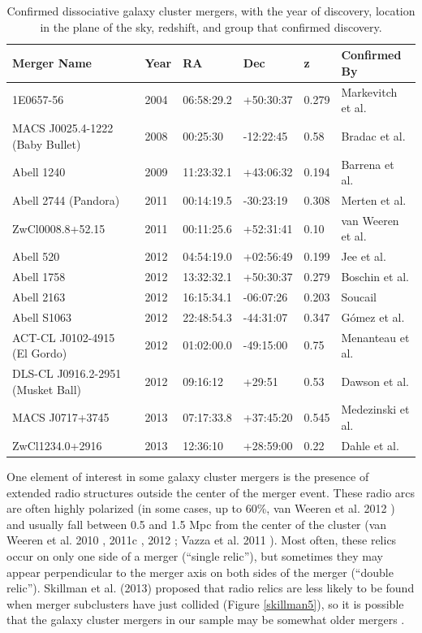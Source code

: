 \documentclass[12 pt]{article}
\renewcommand{\baselinestretch}{2}
\begin{document}
\renewcommand{\baselinestretch}{1}
\begin{table}
\begin{tabular}{|p{2in}|l|l|l|l|l|} \hline
\textbf{Merger Name} & \textbf{Year} & \textbf{RA} & \textbf{Dec} & \textbf{z} & \textbf{Confirmed By} \\ \hline
1E0657-56 & 2004 & 06:58:29.2 & +50:30:37 & 0.279 & Markevitch et al. \cite{Markevitch04} \\
MACS J0025.4-1222 (Baby Bullet) & 2008 & 00:25:30 & -12:22:45 & 0.58 & Bradac et al. \cite{Bradac08} \\
Abell 1240 & 2009 & 11:23:32.1 & +43:06:32 & 0.194 & Barrena et al. \cite{Barrena09} \\
Abell 2744 (Pandora) & 2011 & 00:14:19.5 & -30:23:19 & 0.308 & Merten et al. \cite{Merten11} \\
ZwCl0008.8+52.15 & 2011 & 00:11:25.6 & +52:31:41 & 0.10 & van Weeren et al. \cite{reinout11b} \\
Abell 520 & 2012 & 04:54:19.0 & +02:56:49 & 0.199 & Jee et al. \cite{Jee12} \\
Abell 1758 & 2012 & 13:32:32.1 & +50:30:37 & 0.279 & Boschin et al. \cite{Boschin12} \\
Abell 2163 & 2012 & 16:15:34.1 & -06:07:26 & 0.203 & Soucail  \cite{Soucail12} \\
Abell S1063 & 2012 & 22:48:54.3 & -44:31:07 & 0.347 & G{\'o}mez et al. \cite{Gomez12} \\
ACT-CL J0102-4915 (El Gordo) & 2012 & 01:02:00.0 & -49:15:00 & 0.75 & Menanteau et al. \cite{Menanteau12} \\
DLS-CL J0916.2-2951 (Musket Ball) & 2012 & 09:16:12 & +29:51 & 0.53 & Dawson et al. \cite{Dawson12} \\
MACS J0717+3745 & 2013 & 07:17:33.8 & +37:45:20 & 0.545 & Medezinski et al. \cite{Medezinski13} \\
ZwCl1234.0+2916 & 2013 & 12:36:10 & +28:59:00 & 0.22 & Dahle et al. \cite{Dahle13} \\
\hline
\end{tabular}
\caption{Confirmed dissociative galaxy cluster mergers, with the year of discovery, location in the plane of the sky, redshift, and group that confirmed discovery.}
\label{tab2}
\end{table}
\renewcommand{\baselinestretch}{1}

One element of interest in some galaxy cluster mergers is the presence of extended radio structures outside the center of the merger event. These radio arcs are often highly polarized (in some cases, up to 60\%, van Weeren et al. 2012 \cite{reinout12}) and usually fall between 0.5 and 1.5 Mpc from the center of the cluster (van Weeren et al. 2010 \cite{reinout10}, 2011c \cite{reinout11c}, 2012 \cite{reinout12}; Vazza et al. 2011 \cite{Vazza11}). Most often, these relics occur on only one side of a merger (“single relic”), but sometimes they may appear perpendicular to the merger axis on both sides of the merger (“double relic”). Skillman et al. (2013) proposed that radio relics are less likely to be found when merger subclusters have just collided (Figure \ref{skillman5}), so it is possible that the galaxy cluster mergers in our sample may be somewhat older mergers \cite{Skillman13}. 
\end{document}
